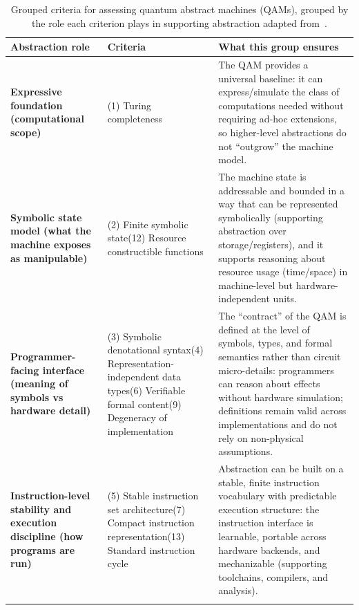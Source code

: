 \begin{table}
    \caption{Grouped criteria for assessing quantum abstract machines (QAMs), grouped by the role each criterion plays in supporting abstraction adapted from~\cite{nunez_corrales2025betterabstractmachines}.}
    \label{tab:lit_rev:abstraction:qam_criteria}

    \footnotesize
    \begin{tabularx}{\textwidth}{p{}p{}X}
        \toprule
        \textbf{Abstraction role} & \textbf{Criteria} & \textbf{What this group ensures} \\ \midrule

        \textbf{Expressive foundation (computational scope)}
        & (1) Turing completeness
        & The QAM provides a universal baseline: it can express/simulate the class of computations needed without requiring ad-hoc extensions, so higher-level abstractions do not “outgrow” the machine model. \\
        \addlinespace

        \textbf{Symbolic state model (what the machine exposes as manipulable)}
        & (2) Finite symbolic state\newline(12) Resource constructible functions
        & The machine state is addressable and bounded in a way that can be represented symbolically (supporting abstraction over storage/registers), and it supports reasoning about resource usage (time/space) in machine-level but hardware-independent units. \\
        \addlinespace

        \textbf{Programmer-facing interface (meaning of symbols vs hardware detail)}
        & (3) Symbolic denotational syntax\newline(4) Representation-independent data types\newline(6) Verifiable formal content\newline(9) Degeneracy of implementation
        & The “contract” of the QAM is defined at the level of symbols, types, and formal semantics rather than circuit micro-details: programmers can reason about effects without hardware simulation; definitions remain valid across implementations and do not rely on non-physical assumptions. \\
        \addlinespace

        \textbf{Instruction-level stability and execution discipline (how programs are run)}
        & (5) Stable instruction set architecture\newline(7) Compact instruction representation\newline(13) Standard instruction cycle
        & Abstraction can be built on a stable, finite instruction vocabulary with predictable execution structure: the instruction interface is learnable, portable across hardware backends, and mechanizable (supporting toolchains, compilers, and analysis). \\
        \addlinespace


\end{tabularx}
\end{table}

